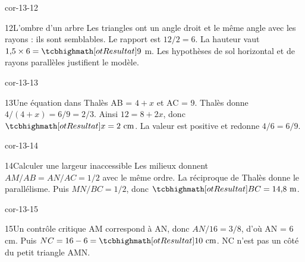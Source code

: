 \begin{blocLivre}{cor-13-12}\begin{corrige}{12}{L’ombre d’un arbre}
Les triangles ont un angle droit et le même angle avec les rayons : ils sont semblables. Le rapport est $12/2=6$. La hauteur vaut $1{,}5\times6=\res9$ m. Les hypothèses de sol horizontal et de rayons parallèles justifient le modèle.
\label{fig-cor-13-12}
\end{corrige}\end{blocLivre}
\begin{blocLivre}{cor-13-13}\begin{corrige}{13}{Une équation dans Thalès}
AB = $4+x$ et AC = 9. Thalès donne $4/(4+x)=6/9=2/3$. Ainsi $12=8+2x$, donc $\res{x=2\text{ cm}}$. La valeur est positive et redonne $4/6=6/9$.
\label{fig-cor-13-13}
\end{corrige}\end{blocLivre}
\begin{blocLivre}{cor-13-14}\begin{corrige}{14}{Calculer une largeur inaccessible}
Les milieux donnent $AM/AB=AN/AC=1/2$ avec le même ordre. La réciproque de Thalès donne le parallélisme. Puis $MN/BC=1/2$, donc $\res{BC=14{,}8\text{ m}}$.
\label{fig-cor-13-14}
\end{corrige}\end{blocLivre}
\begin{blocLivre}{cor-13-15}\begin{corrige}{15}{Un contrôle critique}
AM correspond à AN, donc $AN/16=3/8$, d’où AN = 6 cm. Puis $NC=16-6=\res{10\text{ cm}}$. NC n’est pas un côté du petit triangle AMN.
\label{fig-cor-13-15}
\end{corrige}\end{blocLivre}
